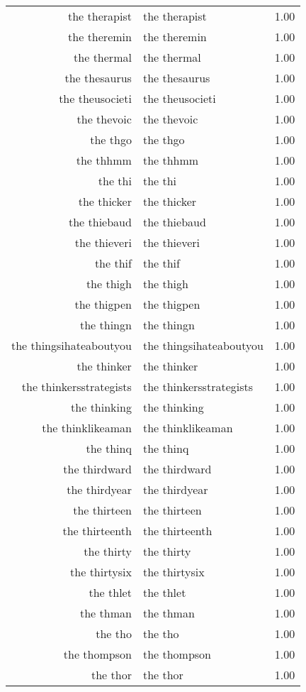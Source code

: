 \begin{table}[ht]
\begin{tabular}{rlr}
  the therapist & the therapist & 1.00 \\ 
  the theremin & the theremin & 1.00 \\ 
  the thermal & the thermal & 1.00 \\ 
  the thesaurus & the thesaurus & 1.00 \\ 
  the theusocieti & the theusocieti & 1.00 \\ 
  the thevoic & the thevoic & 1.00 \\ 
  the thgo & the thgo & 1.00 \\ 
  the thhmm & the thhmm & 1.00 \\ 
  the thi & the thi & 1.00 \\ 
  the thicker & the thicker & 1.00 \\ 
  the thiebaud & the thiebaud & 1.00 \\ 
  the thieveri & the thieveri & 1.00 \\ 
  the thif & the thif & 1.00 \\ 
  the thigh & the thigh & 1.00 \\ 
  the thigpen & the thigpen & 1.00 \\ 
  the thingn & the thingn & 1.00 \\ 
  the thingsihateaboutyou & the thingsihateaboutyou & 1.00 \\ 
  the thinker & the thinker & 1.00 \\ 
  the thinkersstrategists & the thinkersstrategists & 1.00 \\ 
  the thinking & the thinking & 1.00 \\ 
  the thinklikeaman & the thinklikeaman & 1.00 \\ 
  the thinq & the thinq & 1.00 \\ 
  the thirdward & the thirdward & 1.00 \\ 
  the thirdyear & the thirdyear & 1.00 \\ 
  the thirteen & the thirteen & 1.00 \\ 
  the thirteenth & the thirteenth & 1.00 \\ 
  the thirty & the thirty & 1.00 \\ 
  the thirtysix & the thirtysix & 1.00 \\ 
  the thlet & the thlet & 1.00 \\ 
  the thman & the thman & 1.00 \\ 
  the tho & the tho & 1.00 \\ 
  the thompson & the thompson & 1.00 \\ 
  the thor & the thor & 1.00 \\ 

\end{tabular}
\end{table}
